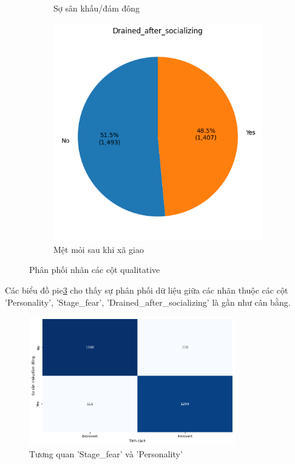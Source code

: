 \begin{figure}[htp]
\begin{subfigure}{0.3\textwidth}
            \caption{Sợ sân khấu/đám đông}
            \label{fig:Table_behavior_stagefear}
        \end{subfigure}
        \hfill
        \begin{subfigure}{0.3\textwidth}
            \includegraphics[width=\textwidth]{images/Table_behavior_drain.png}
            \caption{Mệt mỏi sau khi xã giao}
            \label{fig:Table_behavior_drain}
        \end{subfigure}
        \caption{Phân phối nhãn các cột qualitative}
        \label{fig:Table_behavior_qualitative}
    \end{figure}

    \FloatBarrier

    Các biểu đồ pie\ref{fig:Table_behavior_qualitative} cho thấy sự phân phối dữ liệu giữa các nhãn thuộc các cột 'Personality', 'Stage\_fear', 'Drained\_after\_socializing' là gần như cân bằng.

    \begin{figure}[htp]
        \centering
        \includegraphics[width=0.8\textwidth]{images/Table_behavior_stagefear_personality.png}
        \caption{Tương quan 'Stage\_fear' và 'Personality'}
        \label{fig:Table_behavior_stagefear_personality}
    \end{figure}

